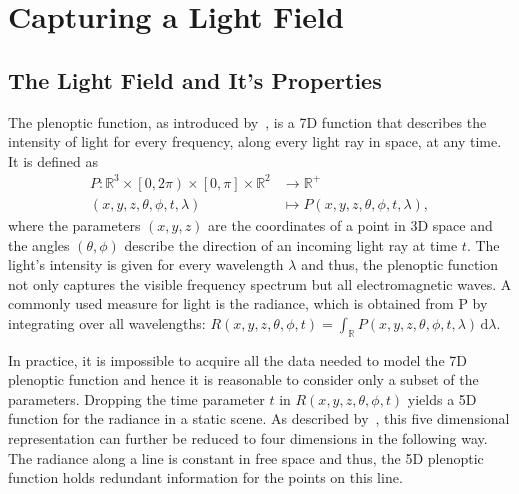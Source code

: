 \chapter{Capturing a Light Field}

\section{The Light Field and It's Properties}

The plenoptic function, as introduced by~\cite{AdelsonBergen}, is a 7D function that describes the intensity of light for every frequency, along every light ray in space, at any time. 
It is defined as
\begin{align*}
	P \colon \mathbb{R}^3 \times \left[0, 2 \pi \right) \times \left[ 0, \pi \right] \times \mathbb{R}^2 & \to \mathbb{R}^+ \\
	\left(x, y, z, \theta, \phi, t, \lambda \right) & \mapsto P\left(x, y, z, \theta, \phi, t, \lambda \right), 
\end{align*}
where the parameters $\left(x, y, z\right)$ are the coordinates of a point in 3D space and the angles $\left(\theta, \phi \right)$ describe the direction of an incoming light ray at time $t$. 
The light's intensity is given for every wavelength $\lambda$ and thus, the plenoptic function not only captures the visible frequency spectrum but all electromagnetic waves. 
A commonly used measure for light is the radiance, which is obtained from P by integrating over all wavelengths: 
$R\left(x, y, z, \theta, \phi, t\right) = \int_{\mathbb{R}} \! P\left(x, y, z, \theta, \phi, t, \lambda \right) \, \mathrm{d} \lambda$.

In practice, it is impossible to acquire all the data needed to model the 7D plenoptic function and hence it is reasonable to consider only a subset of the parameters. 
Dropping the time parameter $t$ in $R\left( x, y, z, \theta, \phi, t \right) $ yields a 5D function for the radiance in a static scene. 
As described by~\cite{LightFieldRendering}, this five dimensional representation can further be reduced to four dimensions in the following way. The radiance along a line is constant in free space and thus, the 5D plenoptic function holds redundant information for the points on this line.

%	
%	
%		
%	
%		
%		
%	
